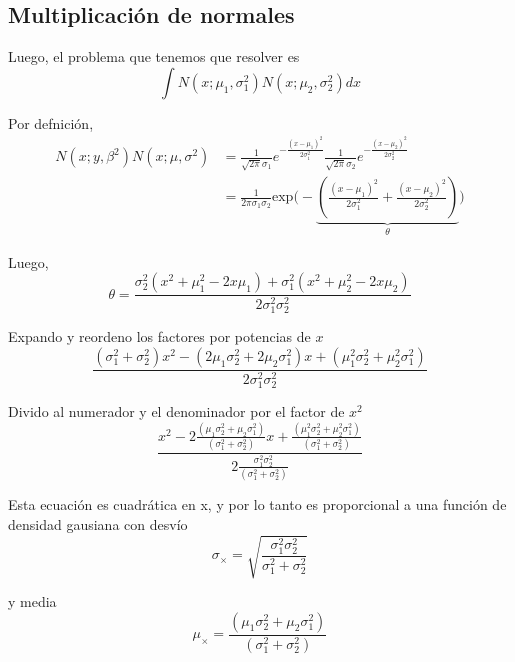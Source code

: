 \documentclass[a4paper,10pt]{article}
\begin{document}
\subsection{Multiplicaci\'on de normales}\label{multiplicacion_normales}

Luego, el problema que tenemos que resolver es
\begin{equation}
 \int N(x;\mu_1,\sigma_1^2)N(x;\mu_2,\sigma_2^2) dx
\end{equation}

Por defnici\'on,
\begin{equation}
\begin{split}
 N(x;y,\beta^2)N(x;\mu,\sigma^2) & = \frac{1}{\sqrt{2\pi}\sigma_1}e^{-\frac{(x-\mu_1)^2}{2\sigma_1^2}} \frac{1}{\sqrt{2\pi}\sigma_2}e^{-\frac{(x-\mu_2)^2}{2\sigma_2^2}}  \\
 & = \frac{1}{2\pi\sigma_1\sigma_2}\text{exp}\Bigg(-\underbrace{\left( \frac{(x-\mu_1)^2}{2\sigma_1^2} + \frac{(x-\mu_2)^2}{2\sigma_2^2} \right)}_{\theta} \Bigg)
\end{split}
\end{equation}

Luego,
\begin{equation}
 \theta = \frac{\sigma_2^2(x^2 + \mu_1^2 - 2x\mu_1) + \sigma_1^2(x^2 + \mu_2^2 - 2x\mu_2) }{2\sigma_1^2\sigma_2^2}
\end{equation}

Expando y reordeno los factores por potencias de $x$
\begin{equation}
 \frac{(\sigma_1^2 + \sigma_2^2) x^2 - (2\mu_1\sigma_2^2 + 2\mu_2\sigma_1^2) x + (\mu_1^2\sigma_2^2 + \mu_2^2\sigma_1^2)}{2\sigma_1^2\sigma_2^2}
\end{equation}

Divido al numerador y el denominador por el factor de $x^2$
\begin{equation}
 \frac{x^2 - 2\frac{(\mu_1\sigma_2^2 + \mu_2\sigma_1^2)}{(\sigma_1^2 + \sigma_2^2) } x + \frac{(\mu_1^2\sigma_2^2 + \mu_2^2\sigma_1^2)}{(\sigma_1^2 + \sigma_2^2) }}{2\frac{\sigma_1^2\sigma_2^2}{(\sigma_1^2 + \sigma_2^2)}}
\end{equation}

Esta ecuaci\'on es cuadr\'atica en x, y por lo tanto es proporcional a una funci\'on de densidad gausiana con desv\'io
\begin{equation}
\sigma_{\times} = \sqrt{\frac{\sigma_1^2\sigma_2^2}{\sigma_1^2+\sigma_2^2}}  
\end{equation}

y media
\begin{equation}
 \mu_{\times} = \frac{(\mu_1\sigma_2^2 + \mu_2\sigma_1^2)}{(\sigma_1^2 + \sigma_2^2) }
\end{equation}
\end{document}
